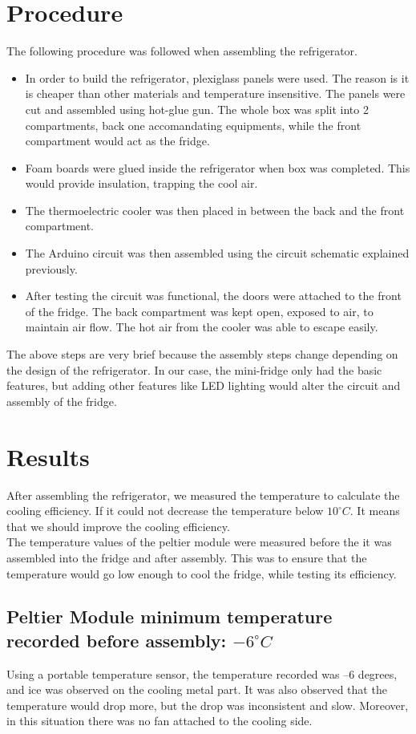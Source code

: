 \documentclass[12pt,onecolumn]{article}
\begin{document}
\section{Procedure}
The following procedure was followed when assembling the refrigerator. 
\begin{itemize}\itemsep -2pt
	\item In order to build the refrigerator, plexiglass panels were used. The reason is it is cheaper than other materials and temperature insensitive. The panels were cut and assembled using hot-glue gun. The whole box was split into 2 compartments, back one accomandating equipments, while the front compartment would act as the fridge.
	\item Foam boards were glued inside the refrigerator when box was completed. This would provide insulation, trapping the cool air. 
	\item The thermoelectric cooler was then placed in between the back and the front compartment. 
	\item The Arduino circuit was then assembled using the circuit schematic explained previously. 
	\item After testing the circuit was functional, the doors were attached to the front of the fridge. The back compartment was kept open, exposed to air, to maintain air flow. The hot air from the cooler was able to escape easily. 
\end{itemize}
The above steps are very brief because the assembly steps change depending on the design of the refrigerator. In our case, the mini-fridge only had the basic features, but adding other features like LED lighting would alter the circuit and assembly of the fridge.  

\section{Results}
After assembling the refrigerator, we measured the temperature to calculate the cooling efficiency. If it could not decrease the temperature below $10^{\circ}C$. It means that we should improve the cooling efficiency.\\  
The temperature values of the peltier module were measured before the it was assembled into the fridge and after assembly. This was to ensure that the temperature would go low enough to cool the fridge, while testing its efficiency. 

\subsection{Peltier Module minimum temperature recorded before assembly: $−6^{\circ}C$}
Using a portable temperature sensor, the temperature recorded was –6 degrees, and ice was observed on the cooling metal part. It was also observed that the temperature would drop more, but the drop was inconsistent and slow. Moreover, in this situation there was no fan attached to the cooling side.
\end{document}
